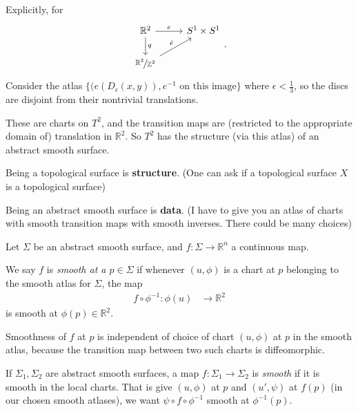 Explicitly, for
        \[
            \begin{tikzcd}
                \mathbb{R}^2 \arrow[d,"q"] \arrow[r, "e"] & S^1\times S^1 \\ \nicefrac{\mathbb{R}^2}{\mathbb{Z}^2} \arrow[ru, "\hat{e}"]& 
            \end{tikzcd}.
        \]
Consider the atlas \(\{(e(D_{\epsilon}(x, y)),e^{-1} \text{ on this image} \}\) where \(\epsilon < \frac{1}{3}\), so the discs are disjoint from their nontrivial translations.

These are charts on \(T^2\), and the transition maps are (restricted to the appropriate domain of) translation in \(\mathbb{R}^2\). So \(T^2\) has the structure (via this atlas) of an abstract smooth surface.

\begin{remark}[Philosophical]
    Being a topological surface is \textbf{structure}. (One can ask if a topological surface \(X\) is a topological surface)

    Being an abstract smooth surface is \textbf{data}. (I have to give you an atlas of charts with smooth transition maps with smooth inverses. There could be many choices)
\end{remark}
\begin{definition}
    Let \(\Sigma\) be an abstract smooth surface, and \(f: \Sigma \to \mathbb{R}^n\) a continuous map.

    We say \(f\) is \textit{smooth at a \(p \in \Sigma\)} if whenever \((u , \phi)\) is a chart at \(p\) belonging to the smooth atlas for \(\Sigma\), the map
    \begin{equation*}
    \begin{aligned}
      f \circ \phi^{-1}\colon \phi(u) & \longrightarrow \mathbb{R}^2
    \end{aligned}
    \end{equation*}
    is smooth at \(\phi(p)\in \mathbb{R}^2\).
\end{definition}
\begin{note}
    Smoothness of \(f\) at \(p\) is independent of choice of chart \((u, \phi)\) at \(p\) in the smooth atlas, because the transition map between two such charts is diffeomorphic.
\end{note}
\begin{definition}
    If \(\Sigma_1, \Sigma_2\) are abstract smooth surfaces, a map \(f: \Sigma_1 \to \Sigma_2\) is \textit{smooth} if it is smooth in the local charts. That is give \((u, \phi)\) at \(p\) and \((u', \psi)\) at \(f(p)\) (in our chosen smooth atlases), we want \(\psi \circ f \circ \phi^{-1}\) smooth at \(\phi^{-1}(p)\).
\end{definition}
